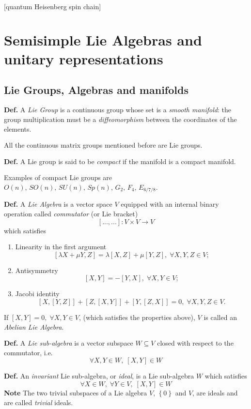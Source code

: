 
[quantum Heisenberg spin chain]

\section{Semisimple Lie Algebras and unitary representations}
\subsection{Lie Groups, Algebras and manifolds}
\textbf{Def.} A \textit{Lie Group} is a continuous group whose set is
a \textit{smooth manifold}: the group multiplication must be a\textit{
diffeomorphism} between the coordinates of the elements.

All the continuous matrix groups mentioned before are Lie groups.

\textbf{Def.} A Lie group is said to be \textit{compact} if the manifold is
a compact manifold.

Examples of compact Lie groups are $O(n),\,SO(n),\,SU(n),\,Sp(n),\,G_2,\,F_4,\,
E_{6/7/8}$.

\textbf{Def.} A \textit{Lie Algebra} is a vector space $V$ equipped with
an internal binary operation called \textit{commutator} (or Lie bracket)
$$\left[...,...\right]: V\times V\to V$$
which satisfies
\begin{enumerate}
    \item Linearity in the first argument
        $$\left[\lambda X+\mu Y, Z\right] = \lambda \left[X,Z\right]+\mu
        \left[Y,Z\right],\;\forall X,Y,Z\in V;$$
    \item Antisymmetry
        $$\left[X,Y\right] = -\left[Y,X\right],\;\forall X,Y\in V;$$
    \item Jacobi identity
        $$\left[X,\left[Y,Z\right]\right] + \left[Z,\left[X,Y\right]\right] +
        \left[Y,\left[Z,X\right]\right] = 0,\;\forall X,Y,Z\in V.$$
\end{enumerate}

If $\left[X,Y\right]=0,\;\forall X,Y\in V$, (which satisfies the properties
above), $V$ is called an \textit{Abelian Lie Algebra}.

\textbf{Def.} A \textit{Lie sub-algebra} is a vector subspace $W\subseteq V$
closed with respect to the commutator, i.e.
$$\forall X,Y\in W,\;\left[X,Y\right]\in W$$

\textbf{Def.} An \textit{invariant} Lie sub-algebra, or \textit{ideal}, is a
Lie sub-algebra $W$ which satisfies
$$\forall X\in W,\;\forall Y\in V,\;\left[X,Y\right]\in W$$
\textbf{Note} The two trivial subspaces of a Lie algebra $V$, $\left\{0\right\}$
and $V$, are ideals and are called \textit{trivial} ideals.

